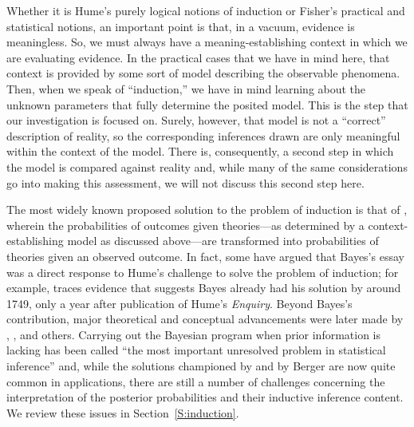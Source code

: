 \documentclass[a4paper, 12pt]{article}
\theoremstyle{plain}
\theoremstyle{definition}
\theoremstyle{remark}
\begin{document}
Whether it is Hume's purely logical notions of induction or Fisher's practical and statistical notions, an important point is that, in a vacuum, evidence is meaningless.  So, we must always have a meaning-establishing context in which we are evaluating evidence.  In the practical cases that we have in mind here, that context is provided by some sort of model describing the observable phenomena.  Then, when we speak of ``induction,'' we have in mind learning about the unknown parameters that fully determine the posited model.  This is the step that our investigation is focused on.  Surely, however, that model is not a ``correct'' description of reality, so the corresponding inferences drawn are only meaningful within the context of the model.  There is, consequently, a second step in which the model is compared against reality and, while many of the same considerations go into making this assessment, we will not discuss this second step here.

The most widely known proposed solution to the problem of induction is that of \citet{bayes1763}, wherein the probabilities of outcomes given theories---as determined by a context-establishing model as discussed above---are transformed into probabilities of theories given an observed outcome.  In fact, some have argued that Bayes's essay was a direct response to Hume's challenge to solve the problem of induction; for example, \citet[Sec.~4]{zabell1989.rule} traces evidence that suggests Bayes already had his solution by around 1749, only a year after publication of Hume's {\em Enquiry}.  Beyond Bayes's contribution, major theoretical and conceptual advancements were later made by \citet{laplace, laplace.essai}, \citet{definetti1937, definetti.vol1, definetti.vol2}, and others.  Carrying out the Bayesian program when prior information is lacking has been called ``the most important unresolved problem in statistical inference'' \citep{efron.cd.discuss} and, while the solutions championed by \citet{jeffreys1946} and by Berger \citep[e.g.,][]{berger.objective.book} are now quite common in applications, there are still a number of challenges concerning the interpretation of the posterior probabilities and their inductive inference content.  We review these issues in Section~\ref{S:induction}.  
\end{document}

